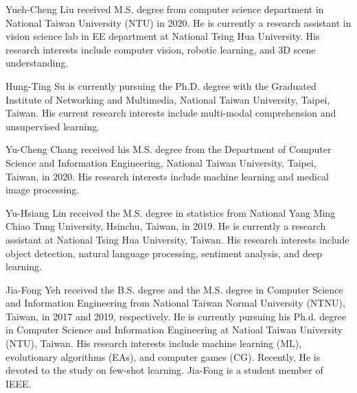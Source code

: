 \documentclass[journal]{IEEEtran}
\begin{document}
\begin{IEEEbiography}
    {Yueh-Cheng Liu}
received M.S. degree from computer science department in National Taiwan University (NTU) in 2020. He is currently a research assistant in vision science lab in EE department at National Tsing Hua University. His research interests include computer vision, robotic learning, and 3D scene understanding.
\end{IEEEbiography}

\begin{IEEEbiography}
    {Hung-Ting Su}
is currently pursuing the Ph.D. degree with the Graduated Institute of Networking and Multimedia, National Taiwan University, Taipei, Taiwan. His current research interests include multi-modal comprehension and unsupervised learning.
\end{IEEEbiography}

\begin{IEEEbiography}
    {Yu-Cheng Chang}
received his M.S. degree from the Department of Computer Science and Information Engineering, National Taiwan University, Taipei, Taiwan, in 2020. His research interests include machine learning and medical image processing.
\end{IEEEbiography}

\begin{IEEEbiography}
    {Yu-Hsiang Lin}
 received the M.S. degree in statistics from National Yang Ming Chiao Tung University, Hsinchu, Taiwan, in 2019. He is currently a research assistant at National Tsing Hua University, Taiwan. His research interests include object detection, natural language processing, sentiment analysis, and deep learning.
 \end{IEEEbiography}

\begin{IEEEbiography}
    {Jia-Fong Yeh}
 received the B.S. degree and the M.S. degree in Computer Science and Information Engineering from National Taiwan Normal University (NTNU), Taiwan, in 2017 and 2019, respectively. He is currently pursuing his Ph.d. degree in Computer Science and Information Engineering at Natioal Taiwan University (NTU), Taiwan. His research interests include machine learning (ML), evolutionary algorithms (EAs), and computer games (CG). Recently, He is devoted to the study on few-shot learning. Jia-Fong is a student member of IEEE.
\end{IEEEbiography}
\end{document}
